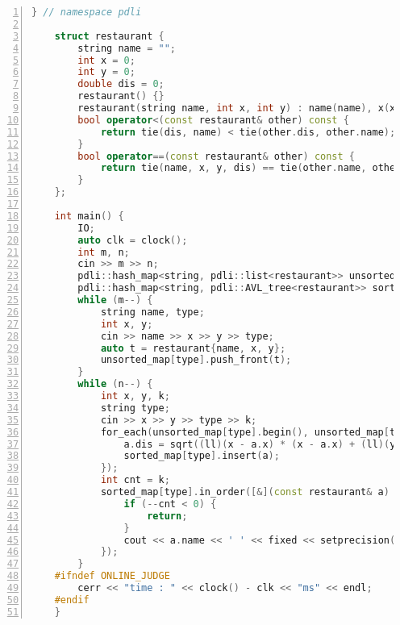 \documentclass{article}
\begin{document}
\begin{lstlisting}[xleftmargin = 2em,xrightmargin = 2em, aboveskip = 0.5em, numbers = left, language = C++]
    } // namespace pdli

    struct restaurant {
        string name = "";
        int x = 0;
        int y = 0;
        double dis = 0;
        restaurant() {}
        restaurant(string name, int x, int y) : name(name), x(x), y(y) {}
        bool operator<(const restaurant& other) const {
            return tie(dis, name) < tie(other.dis, other.name);
        }
        bool operator==(const restaurant& other) const {
            return tie(name, x, y, dis) == tie(other.name, other.x, other.y, other.dis);
        }
    };

    int main() {
        IO;
        auto clk = clock();
        int m, n;
        cin >> m >> n;
        pdli::hash_map<string, pdli::list<restaurant>> unsorted_map;
        pdli::hash_map<string, pdli::AVL_tree<restaurant>> sorted_map;
        while (m--) {
            string name, type;
            int x, y;
            cin >> name >> x >> y >> type;
            auto t = restaurant{name, x, y};
            unsorted_map[type].push_front(t);
        }
        while (n--) {
            int x, y, k;
            string type;
            cin >> x >> y >> type >> k;
            for_each(unsorted_map[type].begin(), unsorted_map[type].end(), [&](restaurant& a) {
                a.dis = sqrt((ll)(x - a.x) * (x - a.x) + (ll)(y - a.y) * (y - a.y));
                sorted_map[type].insert(a);
            });
            int cnt = k;
            sorted_map[type].in_order([&](const restaurant& a) {
                if (--cnt < 0) {
                    return;
                }
                cout << a.name << ' ' << fixed << setprecision(3) << a.dis << endl;
            });
        }
    #ifndef ONLINE_JUDGE
        cerr << "time : " << clock() - clk << "ms" << endl;
    #endif
    }
    \end{lstlisting}
\end{document}
